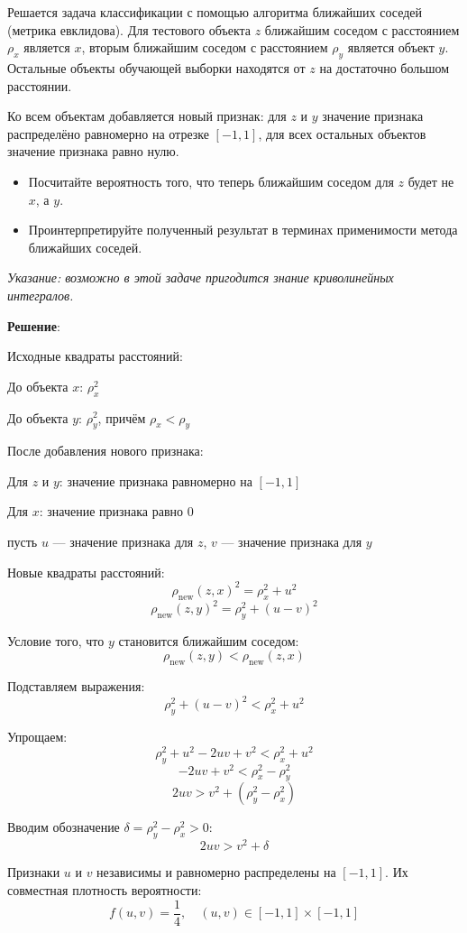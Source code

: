\documentclass{article}
\begin{document}
    Решается задача классификации с помощью алгоритма ближайших соседей (метрика евклидова). Для тестового объекта $z$ ближайшим соседом с расстоянием $\rho_x$ является $x$, вторым ближайшим соседом с расстоянием $\rho_y$ является объект $y$. Остальные объекты обучающей выборки находятся от $z$ на достаточно большом расстоянии.

    Ко всем объектам добавляется новый признак: для $z$ и $y$ значение признака распределёно равномерно на отрезке $[-1, 1]$, для всех остальных объектов значение признака равно нулю. 
    \begin{itemize}
        \item Посчитайте вероятность того, что теперь ближайшим соседом для $z$ будет не $x$, а $y$.
        \item Проинтерпретируйте полученный результат в терминах применимости метода ближайших соседей.
    \end{itemize}

    \noindent
    \emph{Указание: возможно в этой задаче пригодится знание криволинейных интегралов.}

\noindent
\textbf{Решение}:

Исходные квадраты расстояний:

До объекта $x$: $\rho_x^2$

До объекта $y$: $\rho_y^2$, причём $\rho_x < \rho_y$

После добавления нового признака:

Для $z$ и $y$: значение признака равномерно на $[-1, 1]$

Для $x$: значение признака равно 0


пусть $u$ — значение признака для $z$, $v$ — значение признака для $y$


Новые квадраты расстояний:
$$
\rho_{\text{new}}(z, x)^2 = \rho_x^2 + u^2
$$
$$
\rho_{\text{new}}(z, y)^2 = \rho_y^2 + (u - v)^2
$$

Условие того, что $y$ становится ближайшим соседом:
$$
\rho_{\text{new}}(z, y) < \rho_{\text{new}}(z, x)
$$

Подставляем выражения:
$$
\rho_y^2 + (u - v)^2 < \rho_x^2 + u^2
$$

Упрощаем:
$$
\rho_y^2 + u^2 - 2uv + v^2 < \rho_x^2 + u^2 
$$
$$
-2uv + v^2 < \rho_x^2 - \rho_y^2 
$$
$$
2uv > v^2 + (\rho_y^2 - \rho_x^2)
$$

Вводим обозначение $\delta = \rho_y^2 - \rho_x^2 > 0$:
$$
2uv > v^2 + \delta
$$

Признаки $u$ и $v$ независимы и равномерно распределены на $[-1, 1]$. Их совместная плотность вероятности:
$$
f(u, v) = \frac{1}{4}, \quad (u, v) \in [-1, 1] \times [-1, 1]
$$
\end{document}
